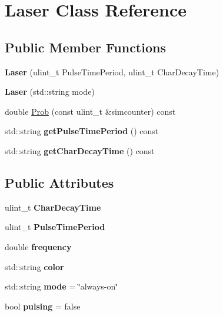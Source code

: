 \hypertarget{classLaser}{}\section{Laser Class Reference}
\label{classLaser}
\subsection*{Public Member Functions}
\begin{DoxyCompactItemize}
\item 
\mbox{\label{classLaser_afb515651480251e4ccea5dbd5262d21a}} 
{\bfseries Laser} (ulint\+\_\+t Pulse\+Time\+Period, ulint\+\_\+t Char\+Decay\+Time)
\item 
\mbox{\label{classLaser_aafec26716f71f738561f1a2f380c12e9}} 
{\bfseries Laser} (std\+::string mode)
\item 
double \hyperlink{classLaser_a01d5f42b155f37b561c2309bca29a179}{Prob} (const ulint\+\_\+t \&simcounter) const
\item 
\mbox{\label{classLaser_a9330015cc55c2a68bfef3205a2c10407}} 
std\+::string {\bfseries get\+Pulse\+Time\+Period} () const
\item 
\mbox{\label{classLaser_aa86760d7217cfbd726c267ce2cef7242}} 
std\+::string {\bfseries get\+Char\+Decay\+Time} () const
\end{DoxyCompactItemize}
\subsection*{Public Attributes}
\begin{DoxyCompactItemize}
\item 
\mbox{\label{classLaser_a4a39c4cc6d51960ffa6399a9468dd664}} 
ulint\+\_\+t {\bfseries Char\+Decay\+Time}
\item 
\mbox{\label{classLaser_aa793891749226ae6b905ec9ff9b8d175}} 
ulint\+\_\+t {\bfseries Pulse\+Time\+Period}
\item 
\mbox{\label{classLaser_ac92a62c1fdf6f7f8838c38e78880900a}} 
double {\bfseries frequency}
\item 
\mbox{\label{classLaser_a3d669dd114057ca81f8f24b46e75c6d9}} 
std\+::string {\bfseries color}
\item 
\mbox{\label{classLaser_aee708c278211cde961b683f81bf421fb}} 
std\+::string {\bfseries mode} = \char`\"{}always-\/on\char`\"{}
\item 
\mbox{\label{classLaser_aa68f4bdee511613dc33fbfaf81111831}} 
bool {\bfseries pulsing} = false
\end{DoxyCompactItemize}


